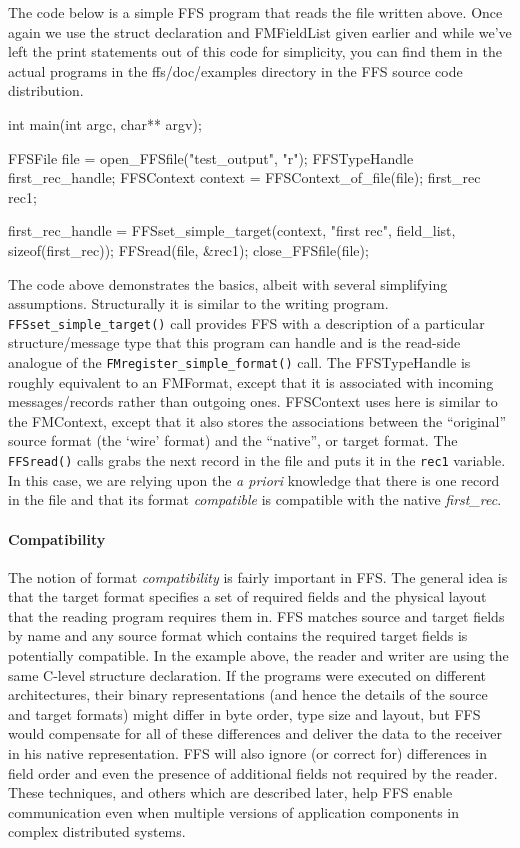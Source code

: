 The code below is a simple FFS program that reads the file written above.
Once again we use the struct declaration and FMFieldList given earlier and
while we've left the print statements out of this code for simplicity, you
can find them in the actual programs in the ffs/doc/examples directory in
the FFS source code distribution. 
\begin{WrapCode}
int
main(int argc, char** argv);
{
    FFSFile file = open_FFSfile("test_output", "r");
    FFSTypeHandle first_rec_handle;
    FFSContext context = FFSContext_of_file(file);
    first_rec rec1;

    first_rec_handle = FFSset_simple_target(context, "first rec", field_list, sizeof(first_rec));
    FFSread(file, &rec1);
    close_FFSfile(file);
}
\end{WrapCode}
The code above demonstrates the basics, albeit with several simplifying
assumptions.  Structurally it is similar to the writing program.  {\tt
  FFSset\_simple\_target()} call provides FFS with a description of a
particular structure/message type that this program can handle and is the
read-side analogue of the {\tt FMregister\_simple\_format()} call. The
FFSTypeHandle is roughly equivalent to an FMFormat, except that it is
associated with incoming messages/records rather than outgoing ones.
FFSContext uses here is similar to the FMContext, except that it also stores
the associations between the ``original'' source format (the `wire' format)
and the ``native'', or target format.  The {\tt FFSread()} calls
grabs the next record in the file and puts it in the {\tt rec1} variable.  In
this case, we are relying upon the {\it a priori} knowledge that there is
one record in the file and that its format {\it compatible} is compatible
with the native {\it first\_rec}.

\paragraph{Compatibility} The notion of format {\it compatibility} is fairly
important in FFS.  The general idea is that the target format specifies a
set of required fields and the physical layout that the reading program
requires them in.  FFS matches source and target fields by name and any
source format which contains the required target fields is potentially
compatible.  In the example above, the reader and writer are using the same
C-level structure declaration.  If the programs were executed on different
architectures, their binary representations (and hence the details of the
source and target formats) might differ in byte order, type size and
layout, but FFS would compensate for all of these differences and deliver the
data to the receiver in his native representation.  FFS will also ignore (or
correct for) differences in field order and even the presence of additional
fields not required by the reader.  These techniques, and others which are
described later, help FFS enable communication even when multiple versions
of application components in complex distributed systems.

